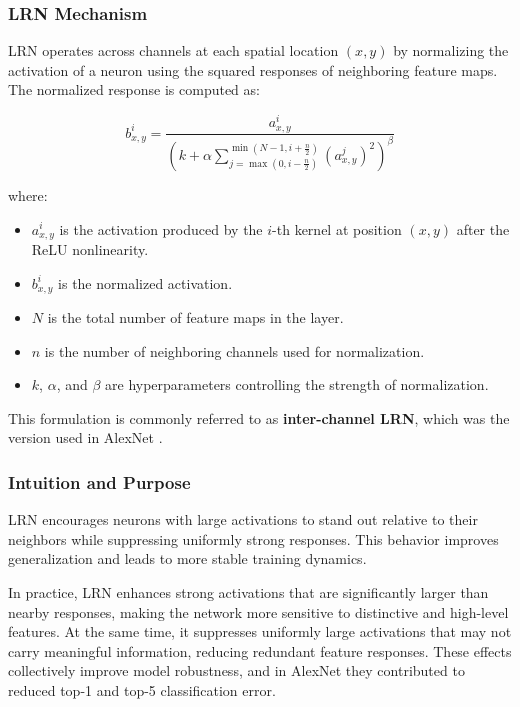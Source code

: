 \documentclass{article}
\begin{document}
\subsubsection{LRN Mechanism}

LRN operates across channels at each spatial location $(x,y)$ by normalizing the activation of a neuron using the squared responses of neighboring feature maps. The normalized response is computed as:

\[
b_{x,y}^i = 
\frac{a_{x,y}^i}
{\left(
k + \alpha 
\sum_{j=\max(0,i-\frac{n}{2})}^{\min(N-1,i+\frac{n}{2})}
\left(a_{x,y}^j\right)^2
\right)^\beta}
\]

where:

\begin{itemize}
    \item $a_{x,y}^i$ is the activation produced by the $i$-th kernel at position $(x,y)$ after the ReLU nonlinearity.
    \item $b_{x,y}^i$ is the normalized activation.
    \item $N$ is the total number of feature maps in the layer.
    \item $n$ is the number of neighboring channels used for normalization.
    \item $k$, $\alpha$, and $\beta$ are hyperparameters controlling the strength of normalization.
\end{itemize}

This formulation is commonly referred to as \textbf{inter-channel LRN}, which was the version used in AlexNet \cite{NIPS2012_c399862d}.

\subsubsection{Intuition and Purpose}

LRN encourages neurons with large activations to stand out relative to their neighbors while suppressing uniformly strong responses. This behavior improves generalization and leads to more stable training dynamics.

In practice, LRN enhances strong activations that are significantly larger than nearby responses, making the network more sensitive to distinctive and high-level features. At the same time, it suppresses uniformly large activations that may not carry meaningful information, reducing redundant feature responses. These effects collectively improve model robustness, and in AlexNet they contributed to reduced top-1 and top-5 classification error.
\end{document}
